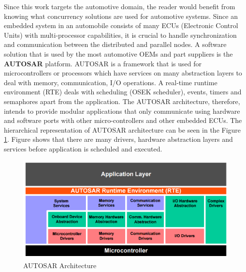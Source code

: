 Since this work targets the automotive domain, the reader would benefit from knowing what concurrency solutions are used for automotive systems. Since an embedded system in an automobile consists of many ECUs (Electronic Control Units) with multi-processor capabilities, it is crucial to handle synchronization and communication between the distributed and parallel nodes. A software solution that is used by the most automotive OEMs and part suppliers is the \textbf{AUTOSAR} platform\cite{autosararch}. AUTOSAR is a framework that is used for microcontrollers or processors which have services on many abstraction layers to deal with memory, communication, I/O operations. A real-time runtime environment (RTE) deals with scheduling (OSEK scheduler), events, timers and semaphores apart from the application. The AUTOSAR architecture, therefore, intends to provide modular applications that only communicate using hardware and software ports with other micro-controllers and other embedded ECUs. The hierarchical representation of AUTOSAR architecture can be seen in the Figure \ref{fig:autosararch}. Figure shows that there are many drivers, hardware abstraction layers and services before application is scheduled and executed.

\begin{figure}[!ht]
	\centering
	\captionsetup{justification=centering}
	\includegraphics[scale=0.35]{content/images/autosararch.png}
	\caption{AUTOSAR Architecture \cite{autosararch}}
	\label{fig:autosararch}
\end{figure}

